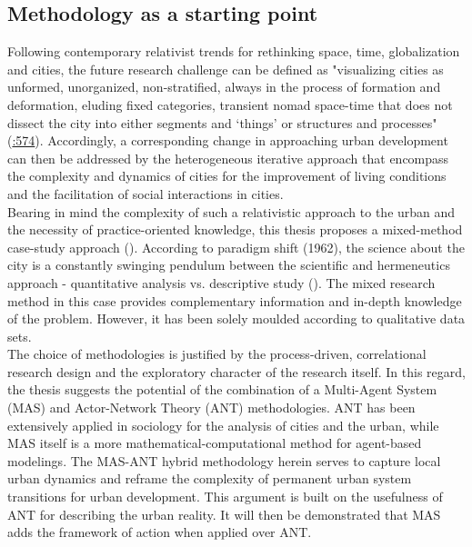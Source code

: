 \documentclass[11pt]{report}
\begin{document}
{{\subsection{Methodology as a starting point}

Following contemporary relativist trends for rethinking space, time, globalization and cities, the future research challenge can be defined as "visualizing cities as unformed, unorganized, non-stratified, always in the process of formation and deformation, eluding fixed categories, transient nomad space-time that does not dissect the city into either segments and ‘things’ or structures and processes" (\href{ref}{\citealt{smith_world_2003}:574}). Accordingly, a corresponding change in approaching urban development can then be addressed by the heterogeneous iterative approach that encompass the complexity and dynamics of cities for the improvement of living conditions and the facilitation of social interactions in cities. 
\\

Bearing in mind the complexity of such a relativistic approach to the urban and the necessity of practice-oriented knowledge, this thesis proposes a mixed-method case-study approach (\href{ref}{\citealt{denzin_case_2005}}). According to \href{Kuhn}{\cite{kuhn_structure_1962}} paradigm shift (1962), the science about the city is a constantly swinging pendulum between the scientific and hermeneutics approach - quantitative analysis vs. descriptive study (\href{ref}{\citealt{portugali_complexity_2011}}). The mixed research method in this case provides complementary information and in-depth knowledge of the problem. However, it has been solely moulded according to qualitative data sets. 
\\

The choice of methodologies is justified by the process-driven, correlational research design and the exploratory character of the research itself. In this regard, the thesis suggests the potential of the combination of a Multi-Agent System (MAS) and Actor-Network Theory (ANT) methodologies. ANT has been extensively applied in sociology for the analysis of cities and the urban, while MAS itself is a more mathematical-computational method for agent-based modelings. The MAS-ANT hybrid methodology herein serves to capture local urban dynamics and reframe the complexity of permanent urban system transitions for urban development. This argument is built on the usefulness of ANT for describing the urban reality. It will then be demonstrated that MAS adds the framework of action when applied over ANT.
\\

}}
\end{document}
